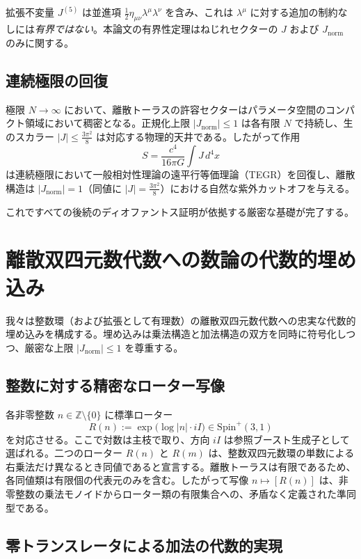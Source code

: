 \documentclass[a4paper]{article}
\theoremstyle{definition}
\theoremstyle{remark}
\newcommand{\Jnorm}{J_{\mathrm{norm}}}
\newcommand{\Jbound}{\frac{3\pi^2}{8}}
\begin{document}
拡張不変量 \(J^{(5)}\) は並進項 \(\frac12 \eta_{\mu\nu}\lambda^\mu\lambda^\nu\) を含み、これは \(\lambda^\mu\) に対する追加の制約なしには\emph{有界ではない}。本論文の有界性定理はねじれセクターの \(J\) および \(\Jnorm\) のみに関する。

\subsection{連続極限の回復}

極限 \( N \to \infty \) において、離散トーラスの許容セクターはパラメータ空間のコンパクト領域において稠密となる。正規化上限 \(|\Jnorm| \leq 1\) は各有限 \(N\) で持続し、生のスカラー \(|J| \leq \Jbound\) は対応する物理的天井である。したがって作用
\[
S = \frac{c^4}{16\pi G} \int J \, d^4x
\]
は連続極限において一般相対性理論の遠平行等価理論（TEGR）を回復し、離散構造は \(|\Jnorm| = 1\)（同値に \(|J| = \Jbound\)）における自然な紫外カットオフを与える。

これですべての後続のディオファントス証明が依拠する厳密な基礎が完了する。

\section{離散双四元数代数への数論の代数的埋め込み}

我々は整数環（および拡張として有理数）の離散双四元数代数への忠実な代数的埋め込みを構成する。埋め込みは乗法構造と加法構造の双方を同時に符号化しつつ、厳密な上限 \( |\Jnorm| \leq 1 \) を尊重する。

\subsection{整数に対する精密なローター写像}

各非零整数 \( n \in \mathbb{Z} \setminus \{0\} \) に標準ローター
\[
R(n) := \exp\bigl( \log |n| \cdot iI \bigr) \in \mathrm{Spin}^+(3,1)
\]
を対応させる。ここで対数は主枝で取り、方向 \( iI \) は参照ブースト生成子として選ばれる。二つのローター \( R(n) \) と \( R(m) \) は、整数双四元数環の単数による右乗法だけ異なるとき同値であると宣言する。離散トーラスは有限であるため、各同値類は有限個の代表元のみを含む。したがって写像 \( n \mapsto [R(n)] \) は、非零整数の乗法モノイドからローター類の有限集合への、矛盾なく定義された準同型である。

\subsection{零トランスレータによる加法の代数的実現}
\end{document}
